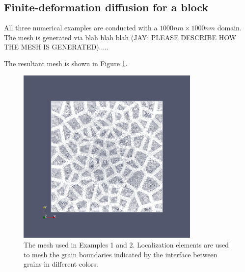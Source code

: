 \documentclass[10pt]{elsarticle}
\begin{document}
\subsection{Finite-deformation diffusion for a block}

All three numerical examples are conducted with a $1000nm \times 1000nm$ domain. The mesh is generated via blah blah blah (JAY: PLEASE DESCRIBE HOW THE MESH IS GENERATED)..... 

The resultant mesh is shown in Figure \ref{fig:mesh}. 
\begin{figure}[h!]
  \centering
    \includegraphics[trim = 0mm 0mm 0mm 0mm, clip,width=0.8\textwidth]{images/mesh_2D.png}
    \caption{The mesh used in Examples 1 and 2. Localization elements are
    used to mesh the grain boundaries indicated by the interface between grains 
    in different colors.}
    \label{fig:mesh}
\end{figure}
\end{document}
